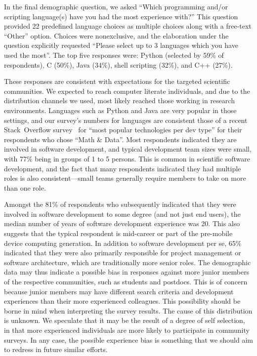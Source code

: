 \documentclass{casicswhitepaper}
\begin{document}
In the final demographic question, we asked ``Which programming and/or scripting language(s) have you had the most experience with?''  This question provided 22 predefined language choices as multiple choices along with a free-text ``Other'' option.  Choices were nonexclusive, and the elaboration under the question explicitly requested ``Please select up to 3 languages which you have used the most''.   The top five responses were: Python (selected by 59\% of respondents), C (50\%), Java (34\%), shell scripting (32\%), and C++ (27\%).

These responses are consistent with expectations for the targeted scientific communities.  We expected to reach computer literate individuals, and due to the distribution channels we used, most likely reached those working in research environments.  Languages such as Python and Java are very popular in those settings, and our survey's numbers for languages are consistent those of a recent Stack~Overflow survey~\cite{stackexchange2016survey} for ``most popular technologies per dev type'' for their respondents who chose ``Math \& Data''.  Most respondents indicated they are involved in software development, and typical development team sizes were small, with 77\% being in groups of 1 to 5 persons.  This is common in scientific software development, and the fact that many respondents indicated they had multiple roles is also consistent---small teams generally require members to take on more than one role.

Amongst the 81\% of respondents who subsequently indicated that they were involved in software development to some degree (and not just end users), the median number of years of software development experience was 20. This also suggests that the typical respondent is mid-career or part of the pre-mobile device computing generation. In addition to software development per se, 65\% indicated that they were also primarily responsible for project management or software architecture, which are traditionally more senior roles.  The demographic data may thus indicate a possible bias in responses against more junior members of the respective communities, such as students and postdocs.  This is of concern because junior members may have different search criteria and development experiences than their more experienced colleagues. This possibility should be borne in mind when interpreting the survey results. The cause of this distribution is unknown.  We speculate that it may be the result of a degree of self selection, in that more experienced individuals are more likely to participate in community surveys.  In any case, the possible experience bias is something that we should aim to redress in future similar efforts.
\end{document}
